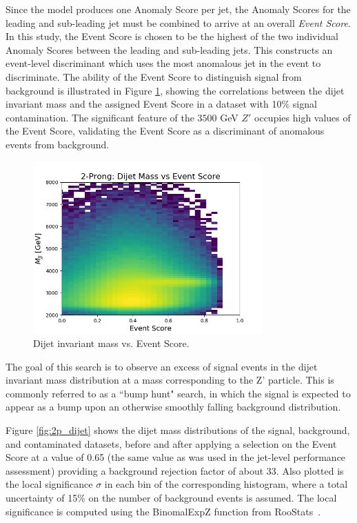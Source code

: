 \documentclass[12pt, a4paper]{article}
\begin{document}
Since the model produces one Anomaly Score per jet, the Anomaly Scores for the leading and sub-leading jet must be combined to arrive at an overall \textit{Event Score}. In this study, the Event Score is chosen to be the highest of the two individual Anomaly Scores between the leading and sub-leading jets. This constructs an event-level discriminant which uses the most anomalous jet in the event to discriminate. The ability of the Event Score to distinguish signal from background is illustrated in Figure \ref{fig:mjj_vs_evscore}, showing the correlations between the dijet invariant mass and the assigned Event Score in a dataset with 10\% signal contamination. The significant feature of the $3500$ GeV $Z'$ occupies high values of the Event Score, validating the Event Score as a discriminant of anomalous events from background.

\begin{figure}[H]
	\begin{center}
		\includegraphics[width=250pt]{imgs/bugfix/ProcR_2Prong_Contaminated_10p0_2Prong_Contaminated_10p0_Weights_Event_ConstOnly_Avg_JJ_M_vs_Event_Score_SaveForPaper_Lead.png}
	\end{center}
	\caption{Dijet invariant mass vs. Event Score.}
	\label{fig:mjj_vs_evscore}
\end{figure}

The goal of this search is to observe an excess of signal events in the dijet invariant mass distribution at a mass corresponding to the Z' particle. 
This is commonly referred to as a ``bump hunt" search, in which the signal is expected to appear as a bump upon an otherwise smoothly falling background distribution. 

Figure \ref{fig:2p_dijet} shows the dijet mass distributions of the signal, background, and contaminated datasets, before and after applying a selection on the Event Score at a value of 0.65 (the same value as was used in the jet-level performance assessment) providing a background rejection factor of about 33. Also plotted is the local significance $\sigma$ in each bin of the corresponding histogram, where a total uncertainty of 15\% on the number of background events is assumed. The local significance is computed using the {\sc BinomalExpZ} function from {\sc RooStats}~\cite{moneta2011roostats}. 
\end{document}
